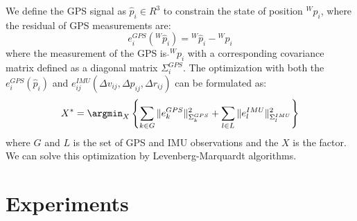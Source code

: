 We define the GPS signal as $\hat p_i \in R^3$ to constrain the state of position ${}^Wp_i$, where the residual of GPS measurements are:
\begin{equation}
e^{GPS}_i( {}^W \hat p_i) = {}^W \hat p_i -  {}^Wp_i 
\end{equation}
where the measurement of the GPS is $\hat {}^Wp_i$ with a corresponding covariance matrix defined as a diagonal matrix $\Sigma^{GPS}_i$.
The optimization with both the $e^{GPS}_i(\hat p_i)$ and $e^{IMU}_{ij}(\Delta v_{ij}, \Delta p_{ij}, \Delta r_{ij})$ can be formulated as:
\begin{equation}
X^* = \argmin_{X}\left\{ \sum_{k\in G} \|e^{GPS}_k\|^2_{\Sigma^{GPS}_k} +  \sum_{l \in L} \| e^{IMU}_l \|^2_{\Sigma^{IMU}_l} \right\}
\end{equation}
where $G$ and $L$ is the set of GPS and IMU observations and the $X$ is the factor. We can solve this optimization by Levenberg-Marquardt algorithms.

\section{Experiments}
\begin{table}[!t]
    \caption{Dataset summary showing the comprehensive evaluation across different IMU grades and platforms}
    \centering
\end{table}

